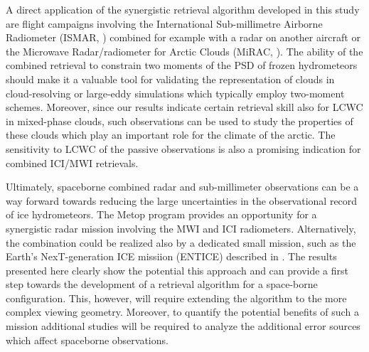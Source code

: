 \documentclass[journal abbreviation, manuscript]{copernicus}
\begin{document}
A direct application of the synergistic retrieval algorithm developed in this
study are flight campaigns involving the International Sub-millimetre Airborne
Radiometer (ISMAR, \citet{fox17}) combined for example with a radar on another
aircraft or the Microwave Radar/radiometer for Arctic Clouds (MiRAC,
\citet{mech19}). The ability of the combined retrieval to constrain two moments
of the PSD of frozen hydrometeors should make it a valuable tool for validating
the representation of clouds in cloud-resolving or large-eddy simulations which
typically employ two-moment schemes. Moreover, since our results indicate
certain retrieval skill also for LCWC in mixed-phase clouds, such observations
can be used to study the properties of these clouds which play an important role
for the climate of the arctic. The sensitivity to LCWC of the passive
observations is also a promising indication for combined ICI/MWI retrievals.

Ultimately, spaceborne combined radar and sub-millimeter observations can be a
way forward towards reducing the large uncertainties in the observational record
of ice hydrometeors. The Metop program provides an opportunity for a synergistic
radar mission involving the MWI and ICI radiometers. Alternatively, the
combination could be realized also by a dedicated small mission, such as the
Earth's NexT-generation ICE missiion (ENTICE) described in \citet{jiang19}. The
results presented here clearly show the potential this approach and can provide
a first step towards the development of a retrieval algorithm for a space-borne
configuration. This, however, will require extending the algorithm to the more
complex viewing geometry. Moreover, to quantify the potential benefits of such a
mission additional studies will be required to analyze the additional error
sources which affect spaceborne observations.



\end{document}
